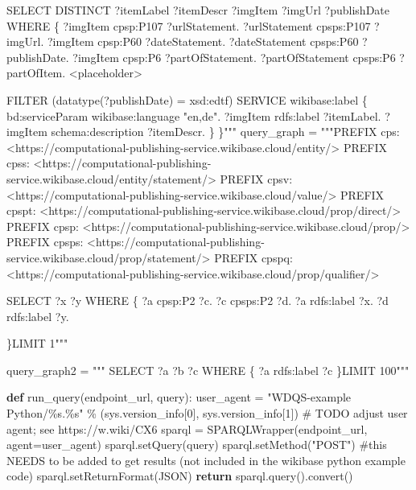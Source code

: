 \documentclass[
  letterpaper,
]{book}
\newenvironment{Shaded}{\begin{snugshade}}{\end{snugshade}}
\newcommand{\AlertTok}[1]{\textcolor[rgb]{0.68,0.00,0.00}{#1}}
\newcommand{\CommentTok}[1]{\textcolor[rgb]{0.37,0.37,0.37}{#1}}
\newcommand{\ControlFlowTok}[1]{\textcolor[rgb]{0.00,0.23,0.31}{\textbf{#1}}}
\newcommand{\DecValTok}[1]{\textcolor[rgb]{0.68,0.00,0.00}{#1}}
\newcommand{\KeywordTok}[1]{\textcolor[rgb]{0.00,0.23,0.31}{\textbf{#1}}}
\newcommand{\NormalTok}[1]{\textcolor[rgb]{0.00,0.23,0.31}{#1}}
\newcommand{\OperatorTok}[1]{\textcolor[rgb]{0.37,0.37,0.37}{#1}}
\newcommand{\SpecialCharTok}[1]{\textcolor[rgb]{0.37,0.37,0.37}{#1}}
\newcommand{\StringTok}[1]{\textcolor[rgb]{0.13,0.47,0.30}{#1}}
\begin{document}
\begin{Shaded}
\begin{Highlighting}[]
\StringTok{SELECT DISTINCT ?itemLabel ?itemDescr ?imgItem ?imgUrl ?publishDate}
\StringTok{WHERE}
\StringTok{\{}
\StringTok{  ?imgItem cpsp:P107 ?urlStatement. }
\StringTok{  ?urlStatement cpsps:P107 ?imgUrl. }
\StringTok{  ?imgItem cpsp:P60 ?dateStatement. }
\StringTok{  ?dateStatement cpsps:P60 ?publishDate. }
\StringTok{  ?imgItem cpsp:P6 ?partOfStatement.}
\StringTok{  ?partOfStatement cpsps:P6 ?partOfItem.}
\StringTok{  \textless{}placeholder\textgreater{} }

\StringTok{  FILTER (datatype(?publishDate) = xsd:edtf)}
\StringTok{  }
\StringTok{  SERVICE wikibase:label \{}
\StringTok{      bd:serviceParam wikibase:language "en,de".}
\StringTok{      ?imgItem rdfs:label ?itemLabel.}
\StringTok{      ?imgItem schema:description ?itemDescr.}
\StringTok{    \}}
\StringTok{\}"""}
\NormalTok{query\_graph }\OperatorTok{=} \StringTok{"""PREFIX cps: \textless{}https://computational{-}publishing{-}service.wikibase.cloud/entity/\textgreater{}}
\StringTok{PREFIX cpss: \textless{}https://computational{-}publishing{-}service.wikibase.cloud/entity/statement/\textgreater{}}
\StringTok{PREFIX cpsv: \textless{}https://computational{-}publishing{-}service.wikibase.cloud/value/\textgreater{}}
\StringTok{PREFIX cpspt: \textless{}https://computational{-}publishing{-}service.wikibase.cloud/prop/direct/\textgreater{}}
\StringTok{PREFIX cpsp: \textless{}https://computational{-}publishing{-}service.wikibase.cloud/prop/\textgreater{}}
\StringTok{PREFIX cpsps: \textless{}https://computational{-}publishing{-}service.wikibase.cloud/prop/statement/\textgreater{}}
\StringTok{PREFIX cpspq: \textless{}https://computational{-}publishing{-}service.wikibase.cloud/prop/qualifier/\textgreater{}}

\StringTok{SELECT ?x ?y}
\StringTok{WHERE}
\StringTok{\{}
\StringTok{  ?a cpsp:P2 ?c.}
\StringTok{  ?c cpsps:P2 ?d.}
\StringTok{  ?a rdfs:label ?x.}
\StringTok{  ?d rdfs:label ?y.}

\StringTok{\}LIMIT 1"""}

\NormalTok{query\_graph2 }\OperatorTok{=} \StringTok{"""}
\StringTok{SELECT ?a ?b ?c}
\StringTok{WHERE}
\StringTok{\{}
\StringTok{  ?a rdfs:label ?c}
\StringTok{\}LIMIT 100"""}


\KeywordTok{def}\NormalTok{ run\_query(endpoint\_url, query):}
\NormalTok{    user\_agent }\OperatorTok{=} \StringTok{"WDQS{-}example Python/}\SpecialCharTok{\%s}\StringTok{.}\SpecialCharTok{\%s}\StringTok{"} \OperatorTok{\%}\NormalTok{ (sys.version\_info[}\DecValTok{0}\NormalTok{], sys.version\_info[}\DecValTok{1}\NormalTok{])}
    \CommentTok{\# }\AlertTok{TODO}\CommentTok{ adjust user agent; see https://w.wiki/CX6}
\NormalTok{    sparql }\OperatorTok{=}\NormalTok{ SPARQLWrapper(endpoint\_url, agent}\OperatorTok{=}\NormalTok{user\_agent)}
\NormalTok{    sparql.setQuery(query)}
\NormalTok{    sparql.setMethod(}\StringTok{"POST"}\NormalTok{) }\CommentTok{\#this NEEDS to be added to get results (not included in the wikibase python example code)}
\NormalTok{    sparql.setReturnFormat(JSON)}
    \ControlFlowTok{return}\NormalTok{ sparql.query().convert()}


\end{Highlighting}
\end{Shaded}
\end{document}
